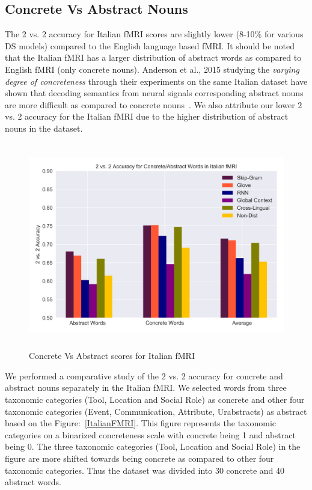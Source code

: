 \subsection{Concrete Vs Abstract Nouns}
The 2 vs. 2 accuracy for Italian fMRI scores are slightly lower (8-10\% for various DS models) compared to the English language based fMRI. It should be noted that the Italian fMRI has a larger distribution of abstract words as compared to English fMRI (only concrete nouns). Anderson et al., 2015 studying the \textit{varying degree of concreteness} through their experiments on the same Italian dataset have shown that decoding semantics from neural signals corresponding abstract nouns are more difficult as compared to concrete nouns~\cite{AndersonConcreteness}. We also attribute our lower 2 vs. 2 accuracy for the Italian fMRI due to the higher distribution of abstract nouns in the dataset.
\begin{figure}[!hb]
\centering
\includegraphics[width=14cm, height=9cm]{Figures/Italian}
\caption{Concrete Vs Abstract scores for Italian fMRI}
\label{ItalianSummary}
\end{figure}
We performed a comparative study of the 2 vs. 2 accuracy for concrete and abstract nouns separately in the Italian fMRI. We selected words from three taxonomic categories (Tool, Location and Social Role) as concrete and other four taxonomic categories (Event, Communication, Attribute, Urabstracts) as abstract based on the Figure:~\ref{ItalianFMRI}. This figure represents the taxonomic categories on a binarized concreteness scale with concrete being 1 and abstract being 0. The three taxonomic categories (Tool, Location and Social Role) in the figure are more shifted towards being concrete as compared to other four taxonomic categories. Thus the dataset was divided into 30 concrete and 40 abstract words.

